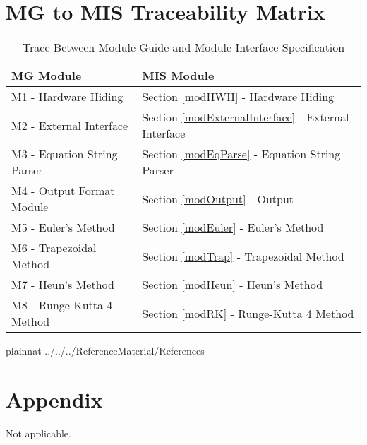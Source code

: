 \documentclass[12pt, titlepage]{article}
\begin{document}
\section{MG to MIS Traceability Matrix}
\begin{table}[H]
\centering
\begin{tabular}{p{} p{}}
\toprule
\textbf{MG Module} & \textbf{MIS Module}\\
\midrule
M1 - Hardware Hiding & Section \ref{modHWH} - Hardware Hiding\\
M2 - External Interface & Section \ref{modExternalInterface} - External Interface\\
M3 - Equation String Parser & Section \ref{modEqParse} - Equation String Parser\\
M4 - Output Format Module & Section \ref{modOutput} - Output\\
M5 - Euler's Method & Section \ref{modEuler} - Euler's Method\\
M6 - Trapezoidal Method & Section \ref{modTrap} - Trapezoidal Method\\
M7 - Heun's Method & Section \ref{modHeun} - Heun's Method\\
M8 - Runge-Kutta 4 Method & Section \ref{modRK} - Runge-Kutta 4 Method\\

\bottomrule
\end{tabular}
\caption{Trace Between Module Guide and Module Interface Specification}
\label{TblRT}
\end{table}

\newpage

 {plainnat}
 {../../../ReferenceMaterial/References}

\newpage

\section{Appendix} \label{Appendix}

Not applicable.
\end{document}
